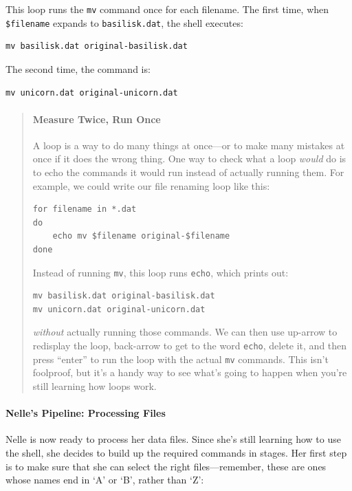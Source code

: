 \documentclass[]{book}
\begin{document}
This loop runs the \texttt{mv} command once for each filename. The first
time, when \texttt{\$filename} expands to \texttt{basilisk.dat}, the
shell executes:

\begin{verbatim}
mv basilisk.dat original-basilisk.dat
\end{verbatim}

The second time, the command is:

\begin{verbatim}
mv unicorn.dat original-unicorn.dat
\end{verbatim}

\begin{quote}
\mbox{}\paragraph{Measure Twice, Run Once}

A loop is a way to do many things at once---or to make many mistakes at
once if it does the wrong thing. One way to check what a loop
\emph{would} do is to echo the commands it would run instead of actually
running them. For example, we could write our file renaming loop like
this:

\begin{verbatim}
for filename in *.dat
do
    echo mv $filename original-$filename
done
\end{verbatim}

Instead of running \texttt{mv}, this loop runs \texttt{echo}, which
prints out:

\begin{verbatim}
mv basilisk.dat original-basilisk.dat
mv unicorn.dat original-unicorn.dat
\end{verbatim}

\emph{without} actually running those commands. We can then use up-arrow
to redisplay the loop, back-arrow to get to the word \texttt{echo},
delete it, and then press ``enter'' to run the loop with the actual
\texttt{mv} commands. This isn't foolproof, but it's a handy way to see
what's going to happen when you're still learning how loops work.
\end{quote}

\mbox{}\paragraph{Nelle's Pipeline: Processing Files}

Nelle is now ready to process her data files. Since she's still learning
how to use the shell, she decides to build up the required commands in
stages. Her first step is to make sure that she can select the right
files---remember, these are ones whose names end in `A' or `B', rather
than `Z':
\end{document}
